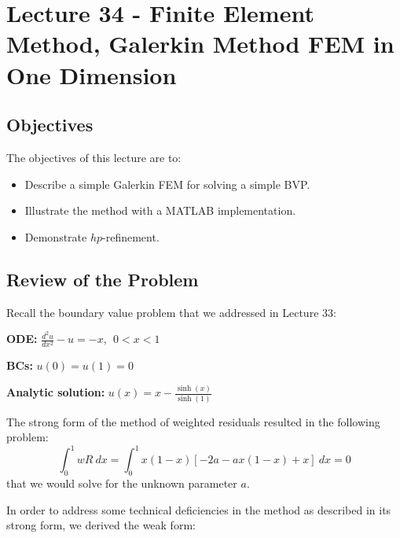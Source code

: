 \chapter{Lecture 34 - Finite Element Method, Galerkin Method FEM in One Dimension}
\label{ch:lec34n}
\section{Objectives}
The objectives of this lecture are to:
\begin{itemize}
\item Describe a simple Galerkin FEM for solving a simple BVP.
\item Illustrate the method with a MATLAB implementation.
\item Demonstrate $hp$-refinement.
\end{itemize}
\setcounter{lstannotation}{0}

\section{Review of the Problem}

Recall the boundary value problem that we addressed in Lecture 33:
\vspace{0.25cm}

\noindent\textbf{ODE:} $ \frac{d^2 u}{dx^2} - u = -x, \ \ 0 < x < 1$

\vspace{0.25cm}

\noindent\textbf{BCs:} $ u(0) = u(1) = 0$

\vspace{0.25cm}

\noindent\textbf{Analytic solution:} $u(x) = x - \frac{\sinh{(x)}}{\sinh{(1)}}$

\vspace{0.25cm}

\noindent The strong form of the method of weighted residuals resulted in the following problem:
\begin{equation*}
\int_{0}^{1} w R \ dx = \int_{0}^{1} x(1-x) \left[-2a - ax(1-x) + x\right] \ dx = 0
\end{equation*}
that we would solve for the unknown parameter $a$.

\vspace{0.25cm}

\noindent In order to address some technical deficiencies in the method as described in its strong form, we derived the weak form:

\vspace{0.25cm}


